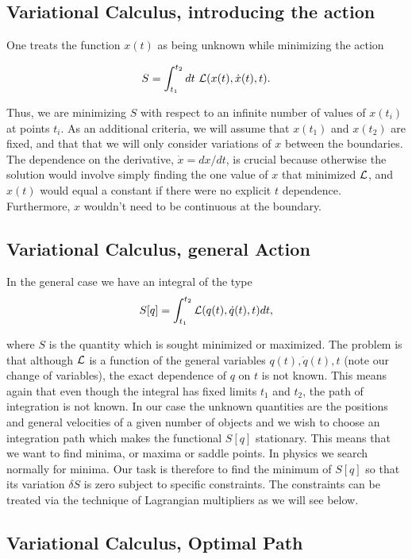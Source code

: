 \documentclass[%
oneside,                 %
final,                   %
10pt]{article}
\begin{document}
\subsection*{Variational Calculus, introducing the action}

One treats the function $x(t)$ as being unknown while minimizing the action

\[
S=\int_{t_1}^{t_2}dt~{\cal L}(x(t),\dot{x}(t),t).
\]

Thus, we are minimizing $S$ with respect to an infinite number of
values of $x(t_i)$ at points $t_i$. As an additional criteria, we will
assume that $x(t_1)$ and $x(t_2)$ are fixed, and that that we will
only consider variations of $x$ between the boundaries. The dependence
on the derivative, $\dot{x}=dx/dt$, is crucial because otherwise the
solution would involve simply finding the one value of $x$ that
minimized ${\cal L}$, and $x(t)$ would equal a constant if there were no
explicit $t$ dependence. Furthermore, $x$ wouldn't need to be
continuous at the boundary.

\subsection*{Variational Calculus, general Action}

In the general case we have an integral of the type
\[ 
S[q]= \int_{t_1}^{t_2} {\cal L}(q(t),\dot{q}(t),t)dt,
\]

where $S$ is the quantity which is sought minimized or maximized.  The
problem is that although ${\cal L}$  is a function of the general variables
$q(t),\dot{q}(t),t$ (note our change of variables), the exact dependence of $q$ on $t$ is not known.
This means again that even though the integral has fixed limits $t_1$
and $t_2$, the path of integration is not known. In our case the unknown
quantities are the positions and general velocities of a given number
of objects and we wish to choose an integration path which makes the
functional $S[q]$ stationary. This means that we want to find minima,
or maxima or saddle points. In physics we search normally for minima.
Our task is therefore to find the minimum of $S[q]$ so that its
variation $\delta S$ is zero subject to specific constraints.  The
constraints can be treated via the technique of Lagrangian multipliers
as we will see below.

\subsection*{Variational Calculus, Optimal Path}
\end{document}
